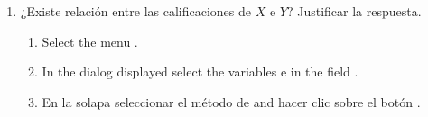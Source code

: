 \begin{enumerate}[leftmargin=*]
{\begin{enumerate}
\item ¿Existe relación entre las calificaciones de $X$ e $Y$? Justificar la respuesta.
\begin{indication}
\begin{enumerate}
\item Select the menu .
\item In the dialog displayed select the variables  e  in the field
.
\item En la solapa  seleccionar el método de  and hacer clic sobre
el botón .
\end{enumerate}
\end{indication}
\end{enumerate}
}
\end{enumerate}


